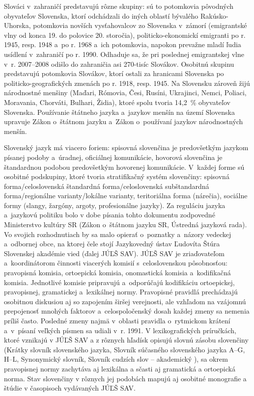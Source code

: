 \begin{multicols}{2}

Slováci v~zahraničí predstavujú rôzne skupiny: sú to potomkovia pôvodných obyvateľov Slovenska, ktorí odchádzali do iných oblastí bývalého Rakúsko-Uhorska, potomkovia novších vysťahovalcov zo Slovenska v~zámorí (emigrantské vlny od konca 19. do polovice 20. storočia), politicko-ekonomickí emigranti po r. 1945, resp. 1948 a~po r. 1968 a~ich potomkovia, napokon prevažne mladí ľudia usídlení v~zahraničí po r. 1990. Odhaduje sa, že pri poslednej emigrantskej vlne v~r. 2007–2008 odišlo do zahraničia asi 270-tisíc Slovákov. Osobitnú skupinu predstavujú potomkovia Slovákov, ktorí ostali za hranicami Slovenska po politicko-geografických zmenách po r. 1918, resp. 1945. Na Slovensku zároveň žijú národnostné menšiny (Maďari, Rómovia, Česi, Rusíni, Ukrajinci, Nemci, Poliaci, Moravania, Chorváti, Bulhari, Židia), ktoré spolu tvoria 14,2~\% obyvateľov Slovenska. Používanie štátneho jazyka a~jazykov menšín na území Slovenska upravuje Zákon o~štátnom jazyku a~Zákon o~používaní jazykov národnostných menšín.

Slovenský jazyk má viacero foriem: spisovná slovenčina je predovšetkým jazykom písanej podoby a~úradnej, oficiálnej komunikácie, hovorová slovenčina je štandardnou podobou predovšetkým hovorenej komunikácie. V~každej forme sú osobitné podskupiny, ktoré tvoria stratifikačný systém slovenčiny: spisovná forma/celoslovenská štandardná forma/celoslovenská subštandardná forma/regionálne varianty/lokálne varianty, teritoriálna forma (nárečia), sociálne formy (slangy, žargóny, argoty, profesionálne jazyky). Za reguláciu jazyka a~jazykovú politiku bolo v dobe písania tohto dokumentu zodpovedné Ministerstvo kultúry SR (Zákon o~štátnom jazyku SR, Ústredná jazyková rada). Vo svojich rozhodnutiach by sa malo opierať o~poznatky a~názory vedeckej a~odbornej obce, na ktorej čele stojí Jazykovedný ústav Ľudovíta Štúra Slovenskej akadémie vied (ďalej JÚĽŠ SAV).
JÚĽŠ SAV je zriaďovateľom a~koordinátorom činnosti viacerých komisií s~celoslovenskou pôsobnosťou: pravopisná komisia, ortoepická komisia, onomastická komisia a~kodifikačná komisia. Jednotlivé komisie pripravujú a~odporúčajú kodifikáciu ortoepickej, pravopisnej, gramatickej a~lexikálnej normy. Pravopisné pravidlá prechádzajú osobitnou diskusiou aj so zapojením širšej verejnosti, ale vzhľadom na vzájomnú prepojenosť mnohých faktorov a~celospoločenský dosah každej zmeny sa nemenia príliš často. Posledné zmeny najmä v~oblasti pravidla o~rytmickom krátení a~v~písaní veľkých písmen sa udiali v~r. 1991. V lexikografických príručkách, ktoré vznikajú v JÚĽŠ SAV a z rôznych hľadísk opisujú slovnú zásobu slovenčiny (Krátky slovník slovenského jazyka, Slovník súčasného slovenského jazyka A–G, H–L, Synonymický slovník, Slovník cudzích slov – akademický \cite{kssj2003,sssj2006,sssj2011,sss2004,scs2005}), sa okrem pravopisnej normy zachytáva aj lexikálna a sčasti aj gramatická a ortoepická norma. Stav slovenčiny v rôznych jej podobách mapujú aj osobitné monografie a štúdie v časopisoch vydávaných JÚĽŠ SAV.


\end{multicols}
